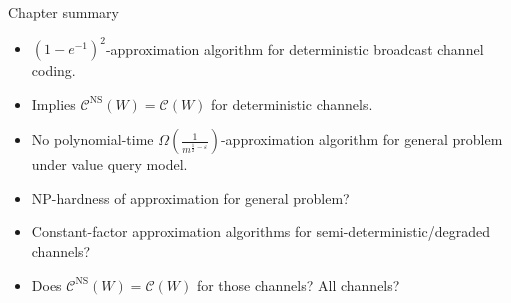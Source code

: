 \documentclass{beamer}
\theoremstyle{definition}
\theoremstyle{remark}
\begin{document}
  



\begin{frame}{Chapter summary}
  \begin{itemize}
  \item $(1-e^{-1})^2$-approximation algorithm for deterministic broadcast channel coding.
  \item Implies $\mathcal{C}^{\mathrm{NS}}(W)=\mathcal{C}(W)$ for deterministic channels.
    \pause
  \item No polynomial-time $\Omega\left(\frac{1}{m^{\frac{1}{2}-\varepsilon}}\right)$-approximation algorithm for general problem under value query model.
    \pause
    \bigskip
  \item \textrm{NP}-hardness of approximation for general problem?
  \item Constant-factor approximation algorithms for semi-deterministic/degraded channels?
  \item Does $\mathcal{C}^{\mathrm{NS}}(W)=\mathcal{C}(W)$ for those channels? All channels?
  \end{itemize}
\end{frame}
\end{document}
